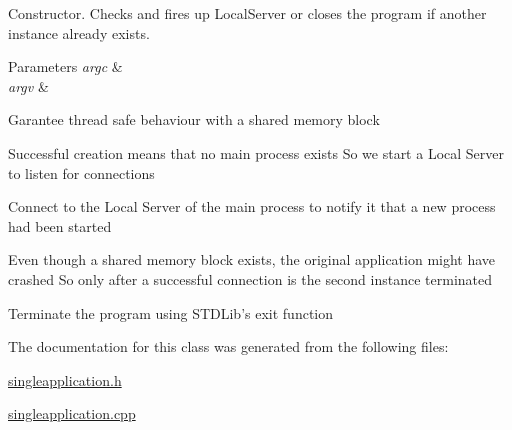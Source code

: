 Constructor. Checks and fires up Local\+Server or closes the program if another instance already exists. 


\begin{DoxyParams}{Parameters}
{\em argc} & \\
\hline
{\em argv} & \\
\hline
\end{DoxyParams}
Garantee thread safe behaviour with a shared memory block

Successful creation means that no main process exists So we start a Local Server to listen for connections

Connect to the Local Server of the main process to notify it that a new process had been started

Even though a shared memory block exists, the original application might have crashed So only after a successful connection is the second instance terminated

Terminate the program using S\+T\+D\+Lib's exit function 

The documentation for this class was generated from the following files\+:\begin{DoxyCompactItemize}
\item 
\hyperlink{singleapplication_8h}{singleapplication.\+h}\item 
\hyperlink{singleapplication_8cpp}{singleapplication.\+cpp}\end{DoxyCompactItemize}
